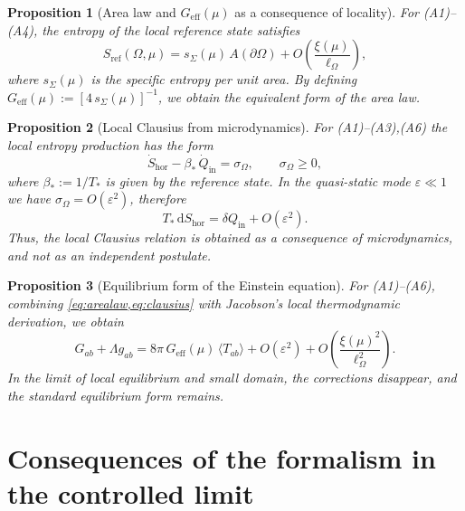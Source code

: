 \documentclass[11pt,a4paper]{article}
\newcommand{\dd}{\mathrm{d}}
\theoremstyle{definition}
\theoremstyle{plain}
\newtheorem{proposition}{Proposition}[section]
\theoremstyle{remark}
\begin{document}
\begin{proposition}[Area law and $G_{\mathrm{eff}}(\mu)$ as a consequence of locality]\label{ax:arealaw}
For (A1)--(A4), the entropy of the local reference state satisfies
\begin{equation}\label{eq:arealaw}
S_{\mathrm{ref}}(\Omega,\mu)
=
s_{\Sigma}(\mu)\,A(\partial\Omega)
+
O\!\left(\frac{\xi(\mu)}{\ell_\Omega}\right),
\end{equation}
where $s_{\Sigma}(\mu)$ is the specific entropy per unit area.
By defining
$G_{\mathrm{eff}}(\mu):=[4\,s_{\Sigma}(\mu)]^{-1}$,
we obtain the equivalent form of the area law.
\end{proposition}

\begin{proposition}[Local Clausius from microdynamics]\label{ax:clausius}
For (A1)--(A3),(A6) the local entropy production has the form
\begin{equation}\label{eq:entropy_production_local}
\dot S_{\mathrm{hor}}-\beta_\ast\,\dot Q_{\mathrm{in}}=\sigma_\Omega,
\qquad
\sigma_\Omega\ge 0,
\end{equation}
where $\beta_\ast:=1/T_\ast$ is given by the reference state.
In the quasi-static mode $\varepsilon\ll1$ we have $\sigma_\Omega=O(\varepsilon^2)$, therefore
\begin{equation}\label{eq:clausius}
T_\ast\,\dd S_{\mathrm{hor}}=\delta Q_{\mathrm{in}}+O(\varepsilon^2).
\end{equation}
Thus, the local Clausius relation is obtained as a consequence of microdynamics, and not as an independent postulate.
\end{proposition}

\begin{proposition}[Equilibrium form of the Einstein equation]\label{ax:einstein}
For (A1)--(A6), combining \cref{eq:arealaw,eq:clausius} with Jacobson's local thermodynamic derivation,
we obtain
\begin{equation}\label{eq:einstein}
G_{ab}+\Lambda g_{ab}
=
8\pi\,G_{\mathrm{eff}}(\mu)\,\langle T_{ab}\rangle
+
O(\varepsilon^2)
+
O\!\left(\frac{\xi(\mu)^2}{\ell_\Omega^2}\right).
\end{equation}
In the limit of local equilibrium and small domain, the corrections disappear, and the standard equilibrium form remains.
\end{proposition}


\section{Consequences of the formalism in the controlled limit}
\label{sec:derivations}
\end{document}
